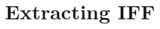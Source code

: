 \documentclass[letterpaper, abstract = on,listof=totoc, bibliography=totoc]{scrreprt}
\begin{document}
%
%
%     
%
%
%
\section{Extracting IFF}
\label{sec:extractIFF}
\end{document}
